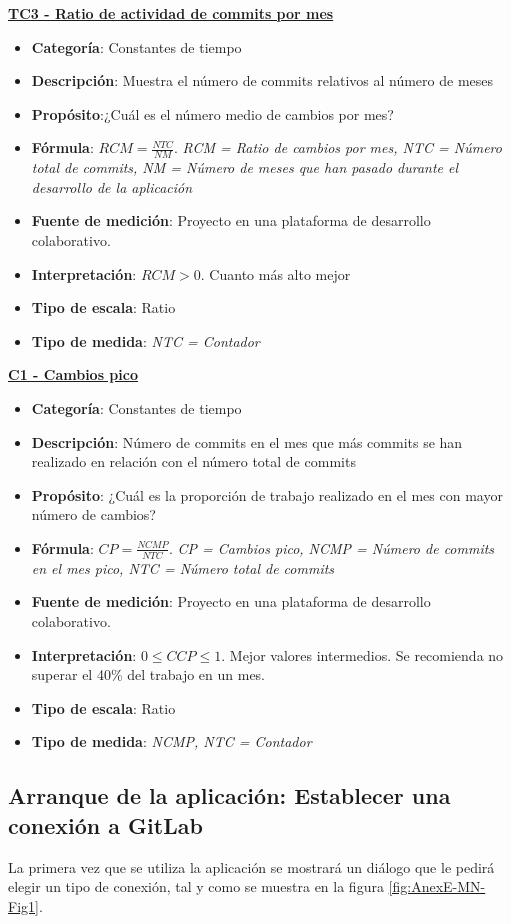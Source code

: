 \textbf{\underline{TC3 - Ratio de actividad de commits por mes}}

\begin{itemize}
	\item \textbf{Categoría}: Constantes de tiempo
	\item \textbf{Descripción}: Muestra el número de commits relativos al número de meses
	\item \textbf{Propósito}:¿Cuál es el número medio de cambios por mes?
	\item \textbf{Fórmula}: $RCM = \frac{NTC}{NM}$. \textit{RCM = Ratio de cambios por mes, NTC = Número total de commits, NM = Número de meses que han pasado durante el desarrollo de la aplicación}
	\item \textbf{Fuente de medición}: Proyecto en una plataforma de desarrollo colaborativo.
	\item \textbf{Interpretación}: $RCM > 0$. Cuanto más alto mejor
	\item \textbf{Tipo de escala}: Ratio
	\item \textbf{Tipo de medida}: \textit{NTC = Contador}
\end{itemize}

\textbf{\underline{C1 - Cambios pico}}

\begin{itemize}
	\item \textbf{Categoría}: Constantes de tiempo
	\item \textbf{Descripción}: Número de commits en el mes que más commits se han realizado en relación con el número total de commits
	\item \textbf{Propósito}: ¿Cuál es la proporción de trabajo realizado en el mes con mayor número de cambios?
	\item \textbf{Fórmula}: $CP = \frac{NCMP}{NTC}$. \textit{CP = Cambios pico, NCMP = Número de commits en el mes pico, NTC = Número total de commits}
	\item \textbf{Fuente de medición}: Proyecto en una plataforma de desarrollo colaborativo.
	\item \textbf{Interpretación}: $0 \leq CCP \leq 1$. Mejor valores intermedios. Se recomienda no superar el 40\% del trabajo en un mes.
	\item \textbf{Tipo de escala}: Ratio
	\item \textbf{Tipo de medida}: \textit{NCMP, NTC = Contador}
\end{itemize}

\subsection{Arranque de la aplicación: Establecer una conexión a GitLab}
La primera vez que se utiliza la aplicación se mostrará un diálogo que le pedirá elegir un tipo de conexión, tal y como se muestra en la figura \ref{fig:AnexE-MN-Fig1}.

